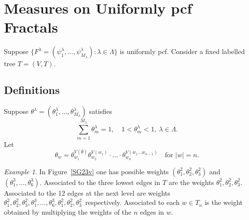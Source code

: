 \documentclass[a4paper]{amsart}
\theoremstyle{plain}
\theoremstyle{definition}
\theoremstyle{remark}
\newtheorem{example}[theorem]{Example}
\begin{document}
\section{\textbf{Measures on Uniformly pcf Fractals}}
Suppose $\{ F^\lambda = (\psi_1^ \lambda, \dots , \psi_{M_\lambda}^ \lambda ) : \lambda \in \Lambda \} $ is uniformly pcf.  Consider a fixed labelled tree $ T = (V,T)$.

\subsection{Definitions}
Suppose $ \theta^ \lambda = ( \theta_1^ \lambda, \dots,  \theta_{M_\lambda }^ \lambda) $ satisfies
\begin{equation} \label{} 
\sum_{m=1}^{M_\lambda} \theta^  \lambda_m= 1, \quad 1 < \theta^  \lambda_m < 1,\ \lambda \in \Lambda .
\end{equation} 
Let
\begin{equation} \label{} 
\theta_w = \theta_{w_1}^{V(\emptyset)} \theta_{w_2}^{V(w_1 )}  
  \cdot \ldots \cdot \theta_{w_n}^{V(w_1\dots w_{n-1} )}\quad  \text{for } |w|=n.
\end{equation} 



\begin{example} In Figure~\ref{SG23v} one has possible weights $ (\theta_1^2,\theta_2^2, \theta_3^2) $ and 
 $ (\theta_1^3,\dots, \theta_6^3) $. Associated to the three lowest edges in $ T $ are the weights 
 $ \theta_1^2,\theta_2^2, \theta_3^2 $.  Associated to the 12 edges at the next level are weights
 $   \theta_1^2,\theta_2^2, \theta_3^2,  \theta_1^3,\dots, \theta_6^3,  \theta_1^2,\theta_2^2, \theta_3^2$\, respectively.  Associated to each $ w \in T_n $ is the weight obtained by multiplying the weights of the $ n $ edges in $ w $.
 \end{example} 
 
\end{document}
